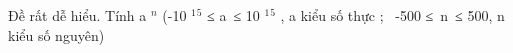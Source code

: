 Đề rất dễ hiểu. Tính a $^ n $ (-10 $^ 1 $$^ 5 $ ≤ a ≤ 10 $^ 1 $$^ 5 $ , a kiểu số thực ;  -500 ≤ n ≤ 500, n kiểu số nguyên)